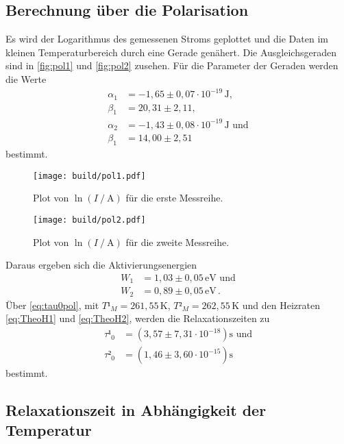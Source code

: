 \subsection{Berechnung über die Polarisation}
\label{sec:BerechnungPolarisation}

Es wird der Logarithmus des gemessenen Stroms geplottet und die Daten im kleinen Temperaturbereich durch eine Gerade genähert.
Die Ausgleichsgeraden sind in \autoref{fig:pol1} und \autoref{fig:pol2} zusehen.
Für die Parameter der Geraden werden die Werte 
\begin{align*}
    \alpha_1 &=   -1,65 \pm 0,07  \cdot 10^{-19} \, \unit{\joule} , \\
    \beta_1  &=   20,31 \pm 2,11                              , \\
    \alpha_2 &=   -1,43 \pm 0,08  \cdot 10^{-19} \, \unit{\joule} \, \,\text{und} \\
    \beta_1  &=   14,00 \pm 2,51
\end{align*}
bestimmt.


\begin{figure}[H]
    \centering
    \texttt{[image: build/pol1.pdf]}
    \caption{Plot von $\ln(I\mathbin{/} \unit{\ampere}) $ für die erste Messreihe.}
    \label{fig:pol1}
\end{figure}
\begin{figure}[H]
    \centering
    \texttt{[image: build/pol2.pdf]}
    \caption{Plot von $\ln(I\mathbin{/} \unit{\ampere}) $ für die zweite Messreihe.}
    \label{fig:pol2}
\end{figure}

Daraus ergeben sich die Aktivierungsenergien 
\begin{align*}
    W_1 &= 1,03 \pm 0,05 \, \unit{\electronvolt}  \, \,  \text{und} \\
    W_2 &= 0,89 \pm 0,05 \, \unit{\electronvolt}    \,.
\end{align*}
Über \eqref{eq:tau0pol}, mit $T¹_M = 261,55 \, \unit{\kelvin}$, $T²_M = 262,55\, \unit{\kelvin}$ 
und den Heizraten \eqref{eq:TheoH1} und \eqref{eq:TheoH2}, werden die Relaxationszeiten zu 
\begin{align*}
    \tau¹_0 &= \left( 3,57 \pm 7,31 \cdot 10^{-18} \right) \unit{\second} \, \, \text{und}  \\
    \tau²_0 &= \left( 1,46 \pm 3,60 \cdot 10^{-15} \right) \unit{\second}   
\end{align*}
bestimmt.

\subsection{Relaxationszeit in Abhängigkeit der Temperatur}

